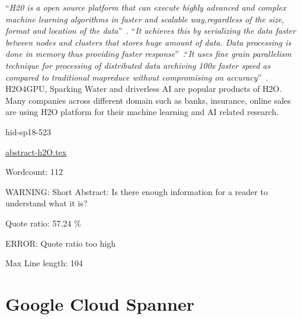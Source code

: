 \color{blue}``\emph{H20 is a open source platform that can execute highly advanced 
and complex machine learning algorithms in faster and scalable 
way,regardless of the size, format and location of the 
data}''\color{black}~\cite{hid-sp18-523-www-h2o}. \color{blue}``\emph{It achieves this by serializing 
the data faster between nodes and clusters that stores huge amount 
of data. Data processing is done in memory thus providing faster 
response}''\color{black}~\cite{hid-sp18-523-www-h2o}.\color{blue}``\emph{It uses fine grain parallelism 
technique for processing of distributed data archiving 100x faster 
speed as compared to traditional mapreduce without compromising 
on accuracy}''\color{black}~\cite{hid-sp18-523-www-h2o}. H2O4GPU, Sparking Water
and driverless AI are popular products of H2O. Many companies
across different domain such as banks, insurance, online sales 
are using H2O platform for their machine learning and AI related
research.







\begin{IU}

hid-sp18-523

\href{https://github.com/cloudmesh-community/hid-sp18-523/blob/master//technology/abstract-h2O.tex}{abstract-h2O.tex}

 

Wordcount: 112

WARNING: Short Abstract: Is there enough information for a reader to understand what it is?


Quote ratio: 57.24 \%

ERROR: Quote ratio too high
 
Max Line length: 104
\end{IU}

\section{Google Cloud Spanner}

